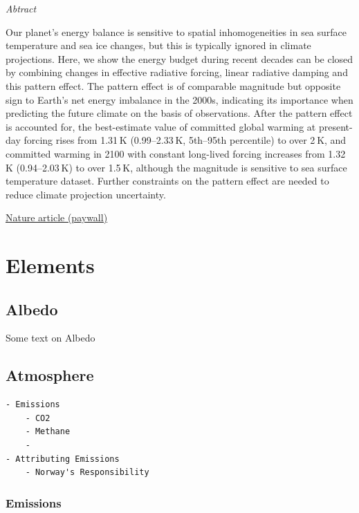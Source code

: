 \documentclass[
]{book}
\begin{document}
\emph{Abtract}

Our planet's energy balance is sensitive to spatial inhomogeneities in sea surface temperature and sea ice changes, but this is typically ignored in climate projections. Here, we show the energy budget during recent decades can be closed by combining changes in effective radiative forcing, linear radiative damping and this pattern effect. The pattern effect is of comparable magnitude but opposite sign to Earth's net energy imbalance in the 2000s, indicating its importance when predicting the future climate on the basis of observations. After the pattern effect is accounted for, the best-estimate value of committed global warming at present-day forcing rises from 1.31 K (0.99--2.33 K, 5th--95th percentile) to over 2 K, and committed warming in 2100 with constant long-lived forcing increases from 1.32 K (0.94--2.03 K) to over 1.5 K, although the magnitude is sensitive to sea surface temperature dataset. Further constraints on the pattern effect are needed to reduce climate projection uncertainty.

\href{https://www.nature.com/articles/s41558-020-00955-x}{Nature article (paywall)}

\hypertarget{part-elements}{%
\part{Elements}\label{part-elements}}

\hypertarget{albedo}{%
\chapter{Albedo}\label{albedo}}

Some text on Albedo

\hypertarget{atmosphere}{%
\chapter{Atmosphere}\label{atmosphere}}

\begin{verbatim}
- Emissions
    - CO2    
    - Methane
    -
- Attributing Emissions
    - Norway's Responsibility
\end{verbatim}

\hypertarget{emissions}{%
\section{Emissions}\label{emissions}}
\end{document}
